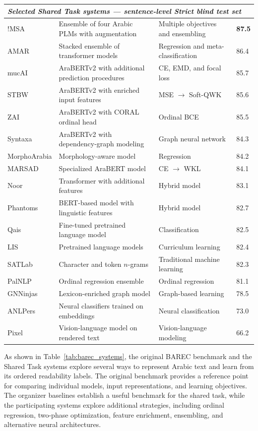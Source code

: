 \documentclass[12pt]{report}
\begin{document}
\begin{table}[htbp]
\begin{tabular}{p{2.2cm} p{4.0cm} p{3.0cm} p{1.6cm}}
\multicolumn{4}{l}{\textit{Selected Shared Task systems --- sentence-level Strict blind test set}} \\
\midrule
!MSA &
Ensemble of four Arabic PLMs with augmentation &
Multiple objectives and ensembling &
\textbf{87.5} \\
AMAR &
Stacked ensemble of transformer models &
Regression and meta-classification &
86.4 \\
mucAI &
AraBERTv2 with additional prediction procedures &
CE, EMD, and focal loss &
85.7 \\
STBW &
AraBERTv2 with enriched input features &
MSE $\rightarrow$ Soft-QWK &
85.6 \\
ZAI &
AraBERTv2 with CORAL ordinal head &
Ordinal BCE &
85.5 \\
Syntaxa &
AraBERTv2 with dependency-graph modeling &
Graph neural network &
84.3 \\
MorphoArabia &
Morphology-aware model &
Regression &
84.2 \\
MARSAD &
Specialized AraBERT model &
CE $\rightarrow$ WKL &
84.1 \\
Noor &
Transformer with additional features &
Hybrid model &
83.1 \\
Phantoms &
BERT-based model with linguistic features &
Hybrid model &
82.7 \\
Qais &
Fine-tuned pretrained language model &
Classification &
82.5 \\
LIS &
Pretrained language models &
Curriculum learning &
82.4 \\
SATLab &
Character and token $n$-grams &
Traditional machine learning &
82.3 \\
PalNLP &
Ordinal regression ensemble &
Ordinal regression &
81.1 \\
GNNinjas &
Lexicon-enriched graph model &
Graph-based learning &
78.5 \\
ANLPers &
Neural classifiers trained on embeddings &
Neural classification &
73.0 \\
Pixel &
Vision-language model on rendered text &
Vision-language modeling &
66.2 \\
\bottomrule
\end{tabular}
\end{table}

As shown in Table~\ref{tab:barec_systems}, the original BAREC benchmark and the Shared Task systems explore several ways to represent Arabic text and learn from its ordered readability labels. The original benchmark provides a reference point for comparing individual models, input representations, and learning objectives. The organizer baselines establish a useful benchmark for the shared task, while the participating systems explore additional strategies, including ordinal regression, two-phase optimization, feature enrichment, ensembling, and alternative neural architectures.
\end{document}
